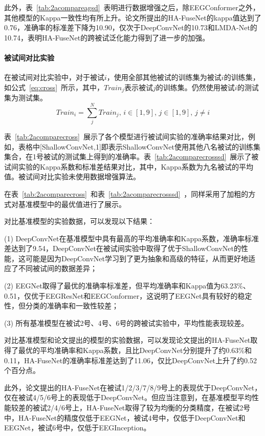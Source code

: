 此外，表~\ref{tab:2acompareagsd}~表明进行数据增强之后，除EEGConformer之外，其他模型的Kappa一致性均有所上升。论文所提出的HA-FuseNet的kappa值达到了0.76，准确率的标准差下降为10.90，仅次于DeepConvNet的10.73和LMDA-Net的10.74，表明HA-FuseNet的跨被试泛化能力得到了进一步的加强。

\paragraph{被试间对比实验}

在被试间对比实验中，对于被试\(i\)，使用全部其他被试的训练集为被试\(i\)的训练集，如公式~\ref{eq:cross}~所示，其中，\(Train_j\)表示被试\(j\)的训练集。仍然使用被试\(i\)的测试集为测试集。
\begin{equation}
    \label{eq:cross}
    Train_i=\sum_{j}^{N}Train_j,\,i \in [1,9],\,j \in [1,9],\,j \neq i
\end{equation}

表~\ref{tab:2acomparecross}~展示了各个模型进行被试间实验的准确率结果对比，例如，表格中[ShallowConvNet,1]即表示ShallowConvNet使用其他八名被试的训练集集合，在1号被试的测试集上得到的准确率。表~\ref{tab:2acomparecrosssd}~展示了被试间实验的Kappa系数和标准差结果对比，其中，Kappa系数为九名被试的平均值。被试间对比实验未使用数据增强算法。

在表~\ref{tab:2acomparecross}~和表~\ref{tab:2acomparecrosssd}~，同样采用了加粗的方式对基准模型中的最优值进行了展示。

对比基准模型的实验数据，可以发现以下结果：

(1) DeepConvNet在基准模型中具有最高的平均准确率和Kappa系数，准确率标准差达到了9.54，DeepConvNet在被试间实验中取得了优于ShallowConvNet的性能，这可能是因为DeepConvNet学习到了更为抽象和高级的特征，从而更好地适应了不同被试间的数据差异；

(2) EEGNet取得了最优的准确率标准差，但平均准确率和Kappa值为63.23\%、0.51，仅优于EEGResNet和EEGConformer，这说明了EEGNet具有较好的稳定性，但分类的准确率和一致性较差；

(3) 所有基准模型在被试2号、4号、6号的跨被试实验中，平均性能表现较差。

对比基准模型和论文提出的模型的实验数据，可以发现论文提出的HA-FuseNet取得了最优的平均准确率和Kappa系数，且比DeepConvNet分别提升了约0.63\%和0.11，HA-FuseNet的准确率标准差达到了11.06，仅比DeepConvNet上升了约0.52个百分点。

此外，论文提出的HA-FuseNet在被试1/2/3/7/8/9号上的表现优于DeepConvNet，仅在被试4/5/6号上的表现低于DeepConvNet。但应当注意到，在基准模型平均性能较差的被试2/4/6号上，HA-FuseNet取得了较为均衡的分类精度，在被试2号中，HA-FuseNet的精度仅低于EEGNet，被试4号中，仅低于DeepConvNet和EEGNet，被试6号中，仅低于EEGInception。

